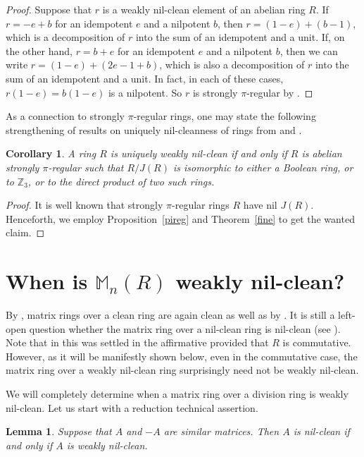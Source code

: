 \documentclass[12]{amsart}
\newtheorem{cor}[thm]{Corollary}
\newtheorem{lem}[thm]{Lemma}
\theoremstyle{definition}
\numberwithin{equation}{section}
\begin{document}
\begin{proof}
Suppose that $r$ is a weakly nil-clean element of an abelian ring $R$.  If $r = -e + b$ for an idempotent $e$ and a nilpotent $b$, then $r = (1 - e) + (b -1)$, which is a decomposition of $r$ into the sum of an idempotent and a unit.  If, on the other hand, $r = b+e$ for an idempotent $e$ and a nilpotent $b$, then we can write $r = (1 - e) + (2e - 1 + b)$, which is also a decomposition of $r$ into the sum of an idempotent and a unit.  In fact, in each of these cases, $r(1-e)=b(1-e)$ is a nilpotent.  So $r$ is strongly $\pi$-regular by \cite[Proposition 2.5]{D13}.
\end{proof}

As a connection to strongly $\pi$-regular rings, one may state the following strengthening of results on uniquely nil-cleanness of rings from \cite{C11} and \cite{D13}.

\begin{cor} A ring $R$ is uniquely weakly nil-clean if and only if $R$ is abelian strongly $\pi$-regular such that $R/J(R)$ is isomorphic to either a Boolean ring, or to $\mathbb Z_3$, or to the direct product of two such rings.
\end{cor}

\begin{proof} It is well known that strongly $\pi$-regular rings $R$ have nil $J(R)$. Henceforth, we employ Proposition~\ref{pireg} and Theorem~\ref{fine} to get the wanted claim.
\end{proof}

\section{When is ${\mathbb M}_n(R)$ weakly nil-clean?}

By \cite{HN01}, matrix rings over a clean ring are again clean as well as by \cite[Proposition 2.6]{N77}. It is still a left-open question whether the matrix ring over a nil-clean ring is
nil-clean (see \cite{D13}). Note that in \cite{BCDM13} this was settled in the affirmative provided that
$R$ is commutative. However, as it will be manifestly shown below, even in the commutative case, the matrix
ring over a weakly nil-clean ring surprisingly need not be weakly nil-clean.

We will completely determine when a matrix ring over a division ring is weakly nil-clean. Let us start with a reduction technical assertion.

\begin{lem}\label{similar} Suppose that $A$ and $-A$ are similar matrices. Then $A$ is nil-clean if and only if $A$ is weakly nil-clean.
\end{lem}
\end{document}
